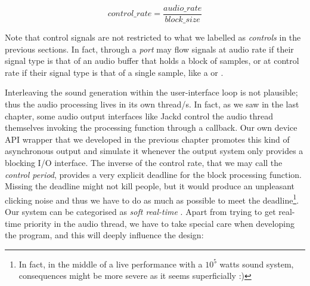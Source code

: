\begin{equation}
  control\_rate = \frac{audio\_rate}{block\_size}  
\end{equation}

Note that control signals are not restricted to what we labelled as
\emph{controls} in the previous sections. In fact, through a
\emph{port} may flow signals at audio rate if their signal type is
that of an audio buffer that holds a block of samples, or at control
rate if their signal type is that of a single sample, like a
 or .

Interleaving the sound generation within the user-interface loop is
not plausible; thus the audio processing lives in its own thread/s. In
fact, as we saw in the last chapter, some audio output interfaces like
Jackd control the audio thread themselves invoking the processing
function through a callback. Our own device API wrapper that we
developed in the previous chapter promotes this kind of asynchronous
output and simulate it whenever the output system only provides a
blocking I/O interface. The inverse of the control rate, that we may
call the \emph{control period}, provides a very explicit deadline for
the block processing function. Missing the deadline might not kill
people, but it would produce an unpleasant clicking noise and thus we
have to do as much as possible to meet the deadline\footnote{In fact,
  in the middle of a live performance with a $10^5$ watts sound
  system, consequences might be more severe as it seems superficially
  :)}. Our system can be categorised as \emph{soft real-time}
\cite{tanenbaum07mos}. Apart from trying to get real-time priority in
the audio thread, we have to take special care when developing the
program, and this will deeply influence the design:


